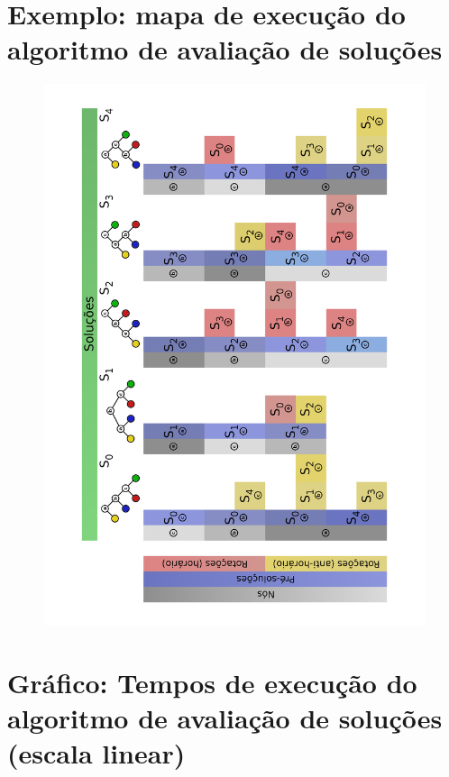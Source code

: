 \begin{anexosenv}
\chapter{Exemplo: mapa de execução do algoritmo de avaliação de soluções}

\begin{figure}[H]
	\begin{center}
	    \includegraphics[scale=0.75]{alg_exp.png}
	\end{center}
\end{figure}

\chapter{Gráfico: Tempos de execução do algoritmo de avaliação de soluções (escala linear)}


\end{anexosenv}
